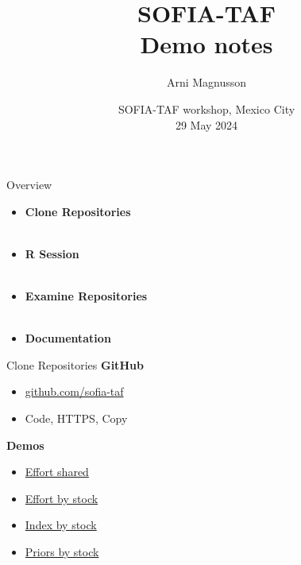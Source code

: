 \documentclass[aspectratio=169]{beamer}
\begin{document}
\begin{frame}
  \title{SOFIA-TAF\\[1ex]
    {\large\darkgreen Demo notes}}
  \author{\vspace{-4ex}
    Arni Magnusson}
  \date{SOFIA-TAF workshop, Mexico City\\[0.2ex]
    29 May 2024}
  \titlepage
\end{frame}


\begin{frame}{Overview}
  \begin{itemize}
    \item[] {\bf\darkblue Clone Repositories}\\[0.1ex]
    \\[3ex]
    \item[] {\bf\darkblue R Session}\\[0.1ex]
    \\[3ex]
    \item[] {\bf\darkblue Examine Repositories}\\[0.1ex]
    \\[3ex]
    \item[] {\bf\darkblue Documentation}\\[0.1ex]
  \end{itemize}
\end{frame}


\begin{frame}{Clone Repositories}
  \textbf{\darkgreen GitHub}\\[0.5ex]
  \begin{itemize}\blue
    \item[] \href{https://github.com/sofia-taf}{github.com/sofia-taf}\\[1ex]
    \item[] Code, HTTPS, Copy\\[1ex]
  \end{itemize}
  \vspace{3ex}
  \textbf{\darkgreen Demos}\\[0.5ex]
  \begin{itemize}\blue
    \item[] \href{https://github.com/sofia-taf/WorkshopEffortShared}{Effort
      shared}\\[1ex]
    \item[] \href{https://github.com/sofia-taf/WorkshopEffortByStock}{Effort by
      stock}\\[1ex]
    \item[] \href{https://github.com/sofia-taf/WorkshopIndexByStock}{Index by
      stock}\\[1ex]
    \item[] \href{https://github.com/sofia-taf/WorkshopPriorsByStock}{Priors by
      stock}
  \end{itemize}
\end{frame}
\end{document}
